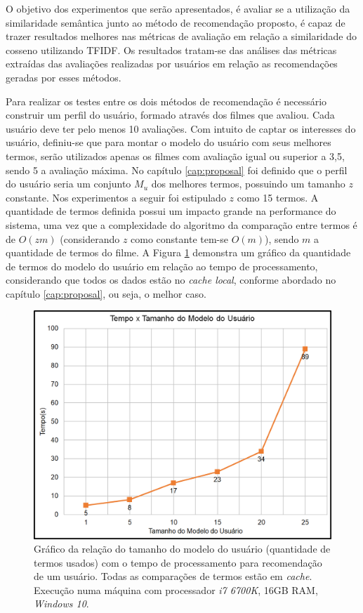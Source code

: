 O objetivo dos experimentos que serão apresentados, é avaliar se a utilização da similaridade semântica junto ao método de recomendação proposto, é capaz de trazer resultados melhores nas métricas de avaliação em relação a similaridade do cosseno utilizando \ac{TFIDF}.  Os resultados tratam-se das análises das métricas extraídas das avaliações realizadas por usuários em relação as recomendações geradas por esses métodos.

Para realizar os testes entre os dois métodos de recomendação é necessário construir um perfil do usuário,
formado através dos filmes que avaliou. Cada usuário deve ter pelo menos 10 avaliações. Com intuito de captar os interesses do usuário, definiu-se que para montar o modelo do usuário com seus melhores termos, serão utilizados apenas os filmes com avaliação igual ou superior a 3,5, sendo 5 a avaliação máxima. No capítulo \ref{cap:proposal} foi definido que o perfil do usuário seria um conjunto $M_u$ dos melhores termos, possuindo um tamanho $z$ constante. Nos experimentos a seguir foi estipulado $z$ como 15 termos. A quantidade de termos definida possui um impacto grande na performance do sistema, uma vez que a complexidade do algoritmo da comparação entre termos é de $O(zm)$ (considerando $z$ como constante tem-se $O(m)$), sendo $m$ a quantidade de termos do filme. A Figura \ref{fig:tempo_x_termos} demonstra um gráfico da quantidade de termos do modelo do usuário em relação ao tempo de processamento, considerando que todos os dados estão no \textit{cache local}, conforme abordado no capítulo \ref{cap:proposal}, ou seja, o melhor caso.

\begin{figure}
	\centering
	\includegraphics[scale=0.3]{imagens/tempo_x_termos.jpg}
	\caption{Gráfico da relação do tamanho do modelo do usuário (quantidade de termos usados) com o tempo de processamento para recomendação de um usuário. Todas as comparações de termos estão em \textit{cache}. Execução numa máquina com processador \textit{i7 6700K}, 16GB RAM, \textit{Windows 10}.}
	\label{fig:tempo_x_termos}
\end{figure}

